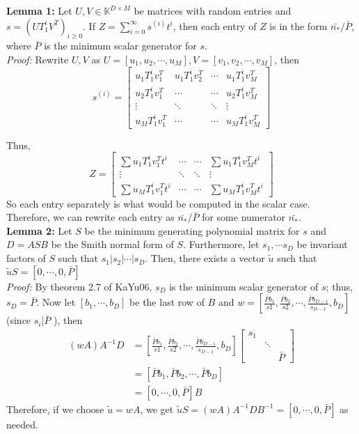 \documentclass[12pt]{article}
\begin{document}
\noindent\textbf{Lemma 1:} Let $U,V \in \mathbb{K}^{D\times M}$
be matrices with random entries and $s = (UT_1^iV^T)_{i \ge 0}$. If 
$Z = \sum_{i = 0}^{\infty} s^{(i)} t^i$, then each entry of $Z$ is
in the form $\bar{n_*}/\bar{P}$, where $\bar{P}$ is the minimum scalar generator for
$s$.\\

\noindent\textit{Proof:} Rewrite $U,V$ as 
$U = [u_1,u_2,\cdots,u_M], V= [v_1,v_2,\cdots,v_M]$, then 
$$s^{(i)} = 
\begin{bmatrix}
u_1T_1^iv_1^T & u_1T_1^iv_2^T & \cdots   & u_1T_1^iv_M^T \\
u_2T_1^iv_1^T & \cdots        & \cdots   & u_2T_1^iv_M^T \\
\vdots        & \ddots        & \ddots   & \vdots \\
u_MT_1^iv_1^T & \cdots        & \cdots   & u_MT_1^iv_M^T 
\end{bmatrix}$$

Thus, 	
$$ Z = 
\begin{bmatrix}
\sum u_1T_1^iv_1^T t^i & \cdots  & \cdots & \sum u_1T_1^iv_M^T t^i \\
\vdots                 & \ddots  & \ddots & \vdots \\
\sum u_MT_1^iv_1^T t^i & \cdots  & \cdots & \sum u_MT_1^iv_M^T  t^i
\end{bmatrix}$$
So each entry separately is what would be computed in the scalar case. Therefore,
we can rewrite each entry as $\bar{n_*}/\bar{P}$ for some numerator $\bar{n_*}$.\\

\noindent\textbf{Lemma 2:} Let $S$ be the minimum generating polynomial matrix for $s$
and $D = ASB$ be the Smith normal form of $S$. Furthermore, let $s_1, \cdots s_D$ be
invariant factors of $S$ such that $s_1 | s_2 | \cdots | s_D$. Then, there exists a vector $\tilde{u}$
such that $\tilde{u} S = [0, \cdots, 0, \bar{P}]$\\

\noindent\textit{Proof:} By theorem 2.7 of KaYu06, $s_D$ is the minimum scalar generator of $s$; thus, $s_D = \bar{P}$. Now let
$[b_1,\cdots,b_D]$ be the last row of $B$ and 
$w = [\frac{\bar{P}b_1}{s1},\frac{\bar{P}b_2}{s2},\cdots,\frac{\bar{P}b_{D-1}}{s_{D-1}},b_D]$ (since $s_i | \bar{P}$ ), then
\begin{align*}
	(w A) A^{-1} D &=  [\frac{\bar{P}b_1}{s1},\frac{\bar{P}b_2}{s2},\cdots,\frac{\bar{P}b_{D-1}}{s_{D-1}},b_D]
	\begin{bmatrix}
	s_1 &        & \\
	    & \ddots & \\
	    &        & \bar{P}
	\end{bmatrix}\\
	    &= [\bar{P}b_1, \bar{P}b_2, \cdots, \bar{P}b_D]\\
	    &= [0,\cdots,0,\bar{P}] B
\end{align*}
Therefore, if we choose $\tilde{u} = w A$, we get
$ \tilde{u} S = (w A) A^{-1} D B^{-1} = [0,\cdots,0,\bar{P}]$ as needed.\\
\end{document}
